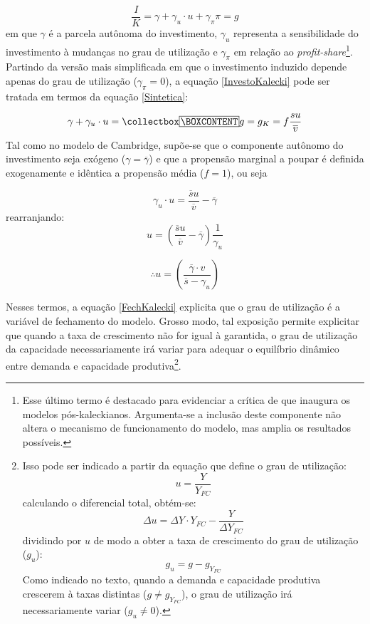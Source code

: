\begin{equation}
    \label{InvestoKalecki}
    \frac{I}{K} = \gamma + \gamma_u\cdot u + \gamma_{\pi}\pi = g
\end{equation}
em que $\gamma$ é a parcela autônoma do investimento, $\gamma_u$ representa a sensibilidade do investimento à mudanças no grau de utilização e $\gamma_{\pi}$ em relação ao \textit{profit-share}\footnote{Esse último termo é destacado para evidenciar a crítica de \textcite{bhaduri_unemployment_1990} que inaugura os modelos pós-kaleckianos. Argumenta-se a inclusão deste componente não altera o mecanismo de funcionamento do modelo, mas amplia os resultados possíveis.}. Partindo da versão mais simplificada em que o investimento induzido depende apenas do grau de utilização ($\gamma_{\pi} = 0$),  a equação \ref{InvestoKalecki} pode ser tratada em termos da equação \ref{Sintetica}:

$$
\gamma + \gamma_u\cdot u = \mybox{g = g_K} = f\frac{s u}{\overline v}
$$
Tal como no modelo de Cambridge, supõe-se que o componente autônomo do investimento seja exógeno ($\gamma = \overline \gamma$) e que a propensão marginal a poupar é definida exogenamente e idêntica a propensão média ($f=1$), ou seja

$$
\gamma_u\cdot u = \frac{\overline s u}{\overline v} - \overline \gamma
$$
rearranjando:
$$
u = \left(\frac{\overline s u}{\overline v} - \overline \gamma\right)\frac{1}{\gamma_u}
$$

\begin{equation}
\label{FechKalecki}
    \therefore u =  \left(\frac{\overline \gamma\cdot v}{\overline s - \gamma_u}\right)
\end{equation}

Nesses termos, a equação \ref{FechKalecki} explicita que o grau de utilização é a variável de fechamento do modelo. Grosso modo, tal exposição permite explicitar que quando a taxa de crescimento não for igual à garantida, o grau de utilização da capacidade necessariamente irá variar para adequar o equilíbrio dinâmico entre demanda e capacidade produtiva\footnote{Isso pode ser indicado a partir da equação que define o grau de utilização:
$$
u = \frac{Y}{Y_{FC}}
$$
calculando o diferencial total, obtém-se:
$$
\Delta u = \Delta Y\cdot Y_{FC} - \frac{Y}{\Delta Y_{FC}}
$$
dividindo por $u$ de modo a obter a taxa de crescimento do grau de utilização ($g_u$):
$$
g_u = g - g_{Y_{FC}}
$$
Como indicado no texto, quando a demanda e capacidade produtiva crescerem à taxas distintas ($g \neq g_{Y_{FC}}$), o grau de utilização irá necessariamente variar ($g_u \neq 0$).
}.

